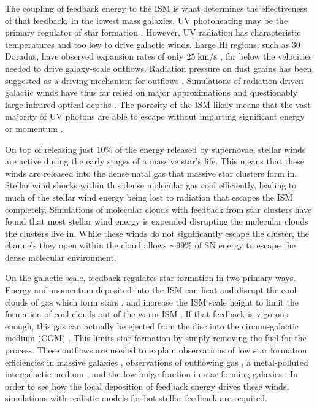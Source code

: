 The coupling of feedback energy to the ISM is what determines the effectiveness
of that feedback.  In the lowest mass galaxies, UV photoheating may be the
primary regulator of star formation \citep{Efstathiou1992}.    However, UV
radiation has characteristic temperatures and too low to drive galactic winds.
Large {\sc Hi} regions, such as 30 Doradus, have observed expansion rates of
only $25\;\rm{km/s}$ \citep{Chu1994}, far below the velocities needed to drive
galaxy-scale outflows.  Radiation pressure on dust grains has been suggested as
a driving mechanism for outflows \citep{Murray2011}.  Simulations of
radiation-driven galactic winds have thus far relied on major approximations
\citep{Roskar2014,Agertz2015} and questionably large infrared optical depths
\citep{Hopkins2014}.  The porosity of the ISM likely means that the vast
majority of UV photons are able to escape without imparting significant energy
or momentum \citep{Dale2005,Walch2012,Krumholz2013}.

On top of releasing just $10\%$ of the energy released by supernovae, stellar
winds are active during the early stages of a massive star's life.  This means
that these winds are released into the dense natal gas that massive star
clusters form in.  Stellar wind shocks within this dense molecular gas cool
efficiently, leading to much of the stellar wind energy being lost to radiation
that escapes the ISM completely.  Simulations of molecular clouds with feedback
from star clusters \citep{Gendelev2012,Rogers2013} have found that most stellar
wind energy is expended disrupting the molecular clouds the clusters live in.
While these winds do not significantly escape the cluster, the channels they
open within the cloud allows $\sim99\%$ of SN energy to escape the dense
molecular environment.

On the galactic scale, feedback regulates star formation in two primary ways.
Energy and momentum deposited into the ISM can heat and disrupt the cool clouds
of gas which form stars \citep{Rogers2013}, and increase the ISM scale height to
limit the formation of cool clouds out of the warm ISM
\citep{Ostriker2010,Benincasa2016}.  If that feedback is vigorous enough, this
gas can actually be ejected from the disc into the circum-galactic medium (CGM)
\citep{Larson1974,Heckman1987,Hopkins2012b}.  This limits star formation by
simply removing the fuel for the process.  These outflows are needed to explain
observations of low star formation efficiencies in massive galaxies
\citep{Behroozi2013,Moster2013}, observations of outflowing gas
\citep{Lynds1963,Heckman1987}, a metal-polluted intergalactic medium
\citep{Shen2010}, and the low bulge fraction in star forming galaxies
\citep{Brook2012}.  In order to see how the local deposition of feedback energy
drives these winds, simulations with realistic models for hot stellar feedback
are required.

